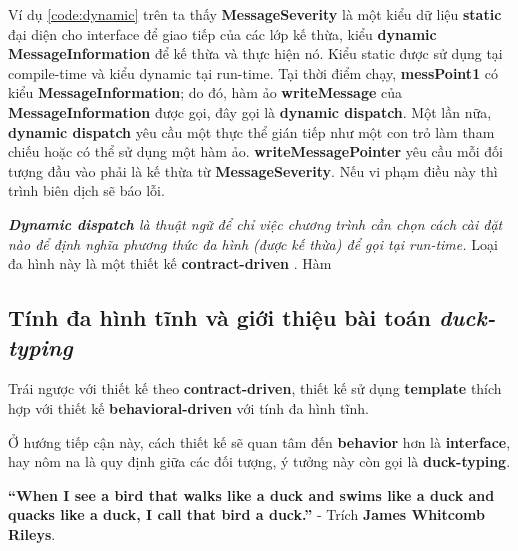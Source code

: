 Ví dụ \ref{code:dynamic} trên ta thấy \textbf{MessageSeverity} là một kiểu dữ liệu \textbf{static} đại diện cho interface để giao tiếp của các lớp kế thừa, kiểu \textbf{dynamic MessageInformation} để kế thừa và thực hiện nó. Kiểu static được sử dụng tại compile-time và kiểu dynamic tại run-time. Tại thời điểm chạy, \textbf{messPoint1} có kiểu \textbf{MessageInformation}; do đó, hàm ảo \textbf{writeMessage} của \textbf{MessageInformation} được gọi, đây gọi là \textbf{dynamic dispatch}. Một lần nữa, \textbf{dynamic dispatch} yêu cầu một thực thể gián tiếp như một con trỏ làm tham chiếu hoặc có thể sử dụng một hàm ảo.
\textbf{writeMessagePointer} yêu cầu mỗi đối tượng đầu vào phải là kế thừa từ \textbf{MessageSeverity}. Nếu vi phạm điều này thì trình biên dịch sẽ báo lỗi.

\textit{\textbf{Dynamic dispatch} là thuật ngữ để chỉ việc chương trình cần chọn cách cài đặt nào để định nghĩa phương thức đa hình (được kế thừa) để gọi tại run-time.}
Loại đa hình này là một thiết kế \textbf{contract-driven} \cite{poly}. Hàm 

\subsection{Tính đa hình tĩnh và giới thiệu bài toán \textit{duck-typing}}
Trái ngược với thiết kế theo \textbf{contract-driven}, thiết kế sử dụng \textbf{template} thích hợp với thiết kế \textbf{behavioral-driven} \cite{poly} với tính đa hình tĩnh.

Ở hướng tiếp cận này, cách thiết kế sẽ quan tâm đến \textbf{behavior} hơn là \textbf{interface}, hay nôm na là quy định giữa các đối tượng, ý tưởng này còn gọi là \textbf{duck-typing}\cite{duck-type}.

\textbf{“When I see a bird that walks like a duck and swims like a duck and quacks like a duck, I call that bird a duck.”} - Trích \textbf{James Whitcomb Rileys}\cite{duck-test}.


